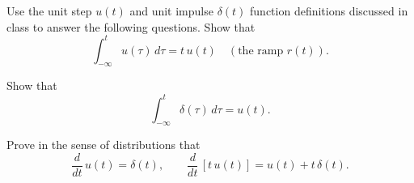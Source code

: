 \documentclass{ee102_pset}
\author{\rule{3cm}{0.4pt}} %
\begin{document}






 Use the unit step $u(t)$ and unit impulse $\delta(t)$ function definitions discussed in class to answer the following questions.
\problempart{[5 points]} Show that
  \[
  \int_{-\infty}^{t} u(\tau)\,d\tau = t\,u(t) \quad (\text{the ramp } r(t)).
  \]

\problempart{[5 points]} Show that
  \[
  \int_{-\infty}^{t}\delta(\tau)\,d\tau = u(t).
  \]

\problempart{[10 points]} Prove in the sense of distributions that
  \[
  \frac{d}{dt}\,u(t)=\delta(t),\qquad \frac{d}{dt}\,[t\,u(t)] = u(t) + t\,\delta(t).
  \]

\end{document}
